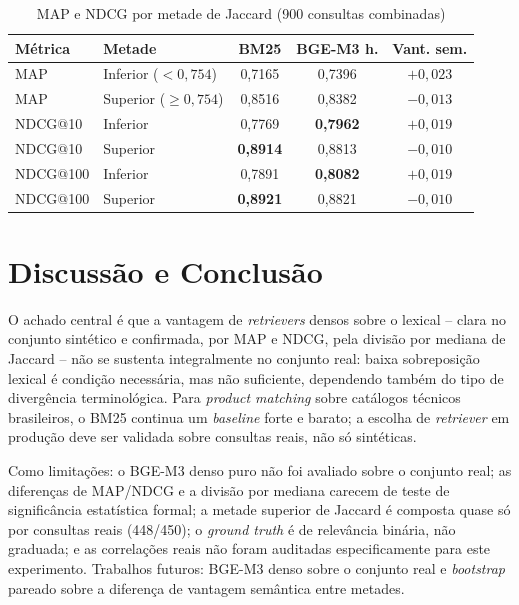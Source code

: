 \documentclass[12pt]{article}
\begin{document}
\begin{table}[ht]
\centering
\small
\caption{MAP e NDCG por metade de Jaccard (900 consultas combinadas)}
\label{tab:split}
\begin{tabular}{|l|l|c|c|c|}
\hline
\textbf{M\'etrica} & \textbf{Metade} & \textbf{BM25} & \textbf{BGE-M3 h.} & \textbf{Vant. sem.} \\
\hline
MAP & Inferior ($<0{,}754$) & 0,7165 & 0,7396 & $+0{,}023$ \\
\hline
MAP & Superior ($\geq0{,}754$) & 0,8516 & 0,8382 & $-0{,}013$ \\
\hline
NDCG@10 & Inferior & 0,7769 & \textbf{0,7962} & $+0{,}019$ \\
\hline
NDCG@10 & Superior & \textbf{0,8914} & 0,8813 & $-0{,}010$ \\
\hline
NDCG@100 & Inferior & 0,7891 & \textbf{0,8082} & $+0{,}019$ \\
\hline
NDCG@100 & Superior & \textbf{0,8921} & 0,8821 & $-0{,}010$ \\
\hline
\end{tabular}
\end{table}

\section{Discuss\~ao e Conclus\~ao}

O achado central \'e que a vantagem de \emph{retrievers} densos sobre o lexical -- clara no conjunto sint\'etico e confirmada, por MAP e NDCG, pela divis\~ao por mediana de Jaccard -- n\~ao se sustenta integralmente no conjunto real: baixa sobreposi\c{c}\~ao lexical \'e condi\c{c}\~ao necess\'aria, mas n\~ao suficiente, dependendo tamb\'em do tipo de diverg\^encia terminol\'ogica. Para \emph{product matching} sobre cat\'alogos t\'ecnicos brasileiros, o BM25 continua um \emph{baseline} forte e barato; a escolha de \emph{retriever} em produ\c{c}\~ao deve ser validada sobre consultas reais, n\~ao s\'o sint\'eticas.

Como limita\c{c}\~oes: o BGE-M3 denso puro n\~ao foi avaliado sobre o conjunto real; as diferen\c{c}as de MAP/NDCG e a divis\~ao por mediana carecem de teste de signific\^ancia estat\'istica formal; a metade superior de Jaccard \'e composta quase s\'o por consultas reais (448/450); o \emph{ground truth} \'e de relev\^ancia bin\'aria, n\~ao graduada; e as correla\c{c}\~oes reais n\~ao foram auditadas especificamente para este experimento. Trabalhos futuros: BGE-M3 denso sobre o conjunto real e \emph{bootstrap} pareado sobre a diferen\c{c}a de vantagem sem\^antica entre metades.



\end{document}
